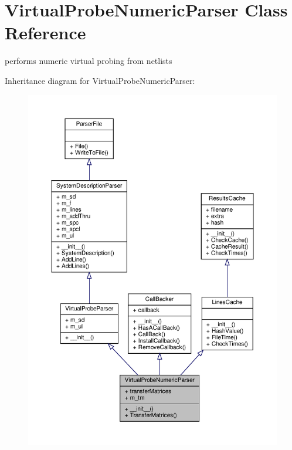 \hypertarget{classSignalIntegrity_1_1Parsers_1_1VirtualProbeNumericParser_1_1VirtualProbeNumericParser}{}\section{Virtual\+Probe\+Numeric\+Parser Class Reference}
\label{classSignalIntegrity_1_1Parsers_1_1VirtualProbeNumericParser_1_1VirtualProbeNumericParser}


performs numeric virtual probing from netlists  




Inheritance diagram for Virtual\+Probe\+Numeric\+Parser\+:
\nopagebreak
\begin{figure}[H]
\begin{center}
\leavevmode
\includegraphics[width=350pt]{classSignalIntegrity_1_1Parsers_1_1VirtualProbeNumericParser_1_1VirtualProbeNumericParser__inherit__graph}
\end{center}
\end{figure}


